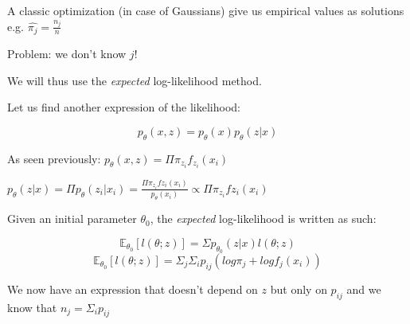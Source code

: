 A classic optimization (in case of Gaussians) give us empirical values as solutions e.g. $\hat{\pi_j}=\frac{n_j}{n}$

Problem: we don't know $j$!

\vspace{5mm}

We will thus use the \textit{expected} log-likelihood method.

Let us find another expression of the likelihood:

$$p_\theta(x,z)=p_\theta(x)p_\theta(z|x)$$

As seen previously: $p_\theta(x,z)=\Pi \pi_{z_i}f_{z_i}(x_i)$

$p_\theta(z|x)=\Pi p_\theta(z_i|x_i)=\frac{\Pi \pi_{z_i}f{z_i}(x_i)}{p_\theta(x_i)} \propto \Pi \pi_{z_i}f{z_i}(x_i)$

\vspace{5mm}

Given an initial parameter $\theta_0$, the \textit{expected} log-likelihood is written as such:

$$\mathbb{E}_{\theta_0}[l(\theta;z)]=\Sigma p_{\theta_0}(z|x) l(\theta;z)$$
$$\mathbb{E}_{\theta_0}[l(\theta;z)]=\Sigma_{j} \Sigma_{i} p_{ij}(log\pi_j+logf_j(x_i))$$

We now have an expression that doesn't depend on $z$ but only on $p_{ij}$ and we know that $n_j=\Sigma_i p_{ij}$

\vspace{5mm}